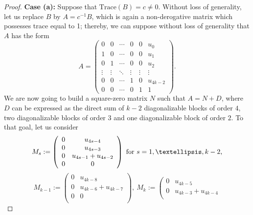 \documentclass[10pt,a4paper]{amsart}
\begin{document}
\begin{proof}
{\bf Case (a):} Suppose that $\text{Trace}(B)=c\ne 0$. Without loss of generality, let us replace $B$ by $A=c^{-1}B$, which is again a non-derogative matrix which possesses trace equal to 1; thereby, we can suppose without loss of generality that $A$ has the form
$$
A=\left(\begin{array}{cccccc}
                                                                          0 & 0 & \cdots & 0 & 0 &u_0\\
                                                                          1 & 0 & \cdots & 0 & 0 &u_1\\
                                                                          0 & 1 & \cdots & 0 & 0 &u_2\\
                                                                          \vdots & \vdots & \ddots & \vdots & \vdots &\vdots\\
                                                                          0 & 0 & \cdots & 1 & 0 &u_{4k-2}\\
                                                                          0 & 0 & \cdots & 0 & 1 &1
                                                                        \end{array}\right).$$
We are now going to build a square-zero matrix $N$ such that $A=N+D$, where $D$ can be expressed as the direct sum of $k-2$ diagonalizable blocks of order $4$, two diagonalizable blocks of order $3$ and one diagonalizable block of order $2$. To that goal, let us consider
$$
M_s:=\left(
   \begin{array}{cc}
      0 &u_{4s-4}\\
      0 &u_{4s-3}\\
      0 &u_{4s-1}+u_{4s-2}\\
      0 &0\\
   \end{array}
 \right) \hbox{ for  $s=1,\dots, k-2$,}
$$
\small
 $$M_{k-1}:=\left(
   \begin{array}{cc}
      0 &u_{4k-8}\\
      0 &u_{4k-6}+u_{4k-7}\\
      0 &0\\
   \end{array}
 \right),\  M_{k}:=\left(
   \begin{array}{cc}
      0 &u_{4k-5}\\
      0 &u_{4k-3}+u_{4k-4}\\

\end{array}$$
\end{proof}
\end{document}

